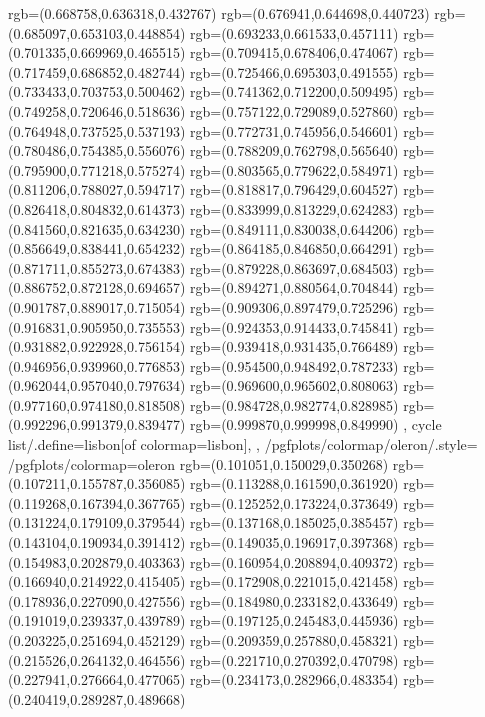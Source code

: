 {{{			rgb=(0.668758,0.636318,0.432767)
			rgb=(0.676941,0.644698,0.440723)
			rgb=(0.685097,0.653103,0.448854)
			rgb=(0.693233,0.661533,0.457111)
			rgb=(0.701335,0.669969,0.465515)
			rgb=(0.709415,0.678406,0.474067)
			rgb=(0.717459,0.686852,0.482744)
			rgb=(0.725466,0.695303,0.491555)
			rgb=(0.733433,0.703753,0.500462)
			rgb=(0.741362,0.712200,0.509495)
			rgb=(0.749258,0.720646,0.518636)
			rgb=(0.757122,0.729089,0.527860)
			rgb=(0.764948,0.737525,0.537193)
			rgb=(0.772731,0.745956,0.546601)
			rgb=(0.780486,0.754385,0.556076)
			rgb=(0.788209,0.762798,0.565640)
			rgb=(0.795900,0.771218,0.575274)
			rgb=(0.803565,0.779622,0.584971)
			rgb=(0.811206,0.788027,0.594717)
			rgb=(0.818817,0.796429,0.604527)
			rgb=(0.826418,0.804832,0.614373)
			rgb=(0.833999,0.813229,0.624283)
			rgb=(0.841560,0.821635,0.634230)
			rgb=(0.849111,0.830038,0.644206)
			rgb=(0.856649,0.838441,0.654232)
			rgb=(0.864185,0.846850,0.664291)
			rgb=(0.871711,0.855273,0.674383)
			rgb=(0.879228,0.863697,0.684503)
			rgb=(0.886752,0.872128,0.694657)
			rgb=(0.894271,0.880564,0.704844)
			rgb=(0.901787,0.889017,0.715054)
			rgb=(0.909306,0.897479,0.725296)
			rgb=(0.916831,0.905950,0.735553)
			rgb=(0.924353,0.914433,0.745841)
			rgb=(0.931882,0.922928,0.756154)
			rgb=(0.939418,0.931435,0.766489)
			rgb=(0.946956,0.939960,0.776853)
			rgb=(0.954500,0.948492,0.787233)
			rgb=(0.962044,0.957040,0.797634)
			rgb=(0.969600,0.965602,0.808063)
			rgb=(0.977160,0.974180,0.818508)
			rgb=(0.984728,0.982774,0.828985)
			rgb=(0.992296,0.991379,0.839477)
			rgb=(0.999870,0.999998,0.849990)
		},
	cycle list/.define={lisbon}{[of colormap=lisbon]},
	},
	/pgfplots/colormap/oleron/.style={
		/pgfplots/colormap={oleron}{%
			rgb=(0.101051,0.150029,0.350268)
			rgb=(0.107211,0.155787,0.356085)
			rgb=(0.113288,0.161590,0.361920)
			rgb=(0.119268,0.167394,0.367765)
			rgb=(0.125252,0.173224,0.373649)
			rgb=(0.131224,0.179109,0.379544)
			rgb=(0.137168,0.185025,0.385457)
			rgb=(0.143104,0.190934,0.391412)
			rgb=(0.149035,0.196917,0.397368)
			rgb=(0.154983,0.202879,0.403363)
			rgb=(0.160954,0.208894,0.409372)
			rgb=(0.166940,0.214922,0.415405)
			rgb=(0.172908,0.221015,0.421458)
			rgb=(0.178936,0.227090,0.427556)
			rgb=(0.184980,0.233182,0.433649)
			rgb=(0.191019,0.239337,0.439789)
			rgb=(0.197125,0.245483,0.445936)
			rgb=(0.203225,0.251694,0.452129)
			rgb=(0.209359,0.257880,0.458321)
			rgb=(0.215526,0.264132,0.464556)
			rgb=(0.221710,0.270392,0.470798)
			rgb=(0.227941,0.276664,0.477065)
			rgb=(0.234173,0.282966,0.483354)
			rgb=(0.240419,0.289287,0.489668)
}}}
